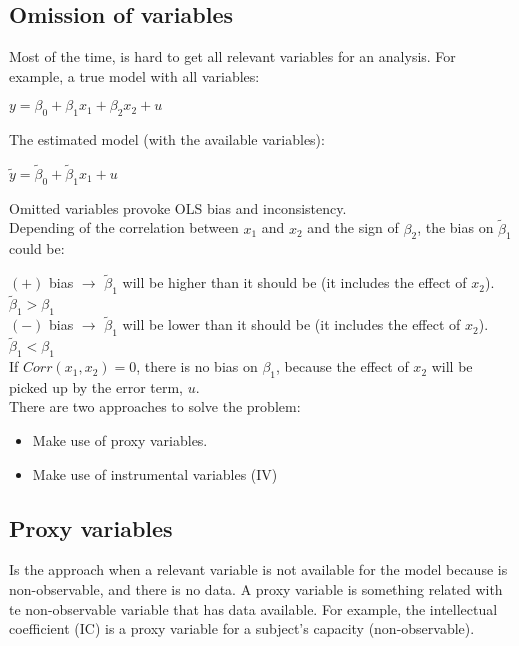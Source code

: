 \documentclass[10pt, a4paper, landscape]{extarticle}
\begin{document}
\begin{multicols}{3}
\section*{Omission of variables}
	Most of the time, is hard to get all relevant variables for an analysis. For example, a true model with all variables:
	\begin{center}
		$y = \beta_0 + \beta_1 x_1 + \beta_2 x_2 + u$
	\end{center}
	The estimated model (with the available variables):
	\begin{center}
		$\tilde{y} = \tilde{\beta}_0 + \tilde{\beta}_1 x_1 + u$
	\end{center}
	Omitted variables provoke OLS bias and inconsistency.
	\\ Depending of the correlation between $x_1$ and $x_2$ and the sign of $\beta_2$, the bias on $\tilde{\beta}_1$ could be:
	\begin{center}
	\end{center}
	$(+)$ bias $\rightarrow$ $\tilde{\beta}_1$ will be higher than it should be (it includes the effect of $x_2$). $\tilde{\beta}_1 > \beta_1$
	\\ $(-)$ bias $\rightarrow$ $\tilde{\beta}_1$ will be lower than it should be (it includes the effect of $x_2$). $\tilde{\beta}_1 < \beta_1$
	\\ If $Corr(x_1,x_2) = 0$, there is no bias on $\beta_1$, because the effect of $x_2$ will be picked up by the error term, $u$.
	\\ There are two approaches to solve the problem:
	\begin{itemize}[leftmargin=*]
		\item Make use of proxy variables.
		\item Make use of instrumental variables (IV)
	\end{itemize}
	\subsection*{Proxy variables}
		Is the approach when a relevant variable is not available for the model because is non-observable, and there is no data. A proxy variable is something related with te non-observable variable that has data available.
		For example, the intellectual coefficient (IC) is a proxy variable for a subject's capacity (non-observable).

\end{multicols}
\end{document}
